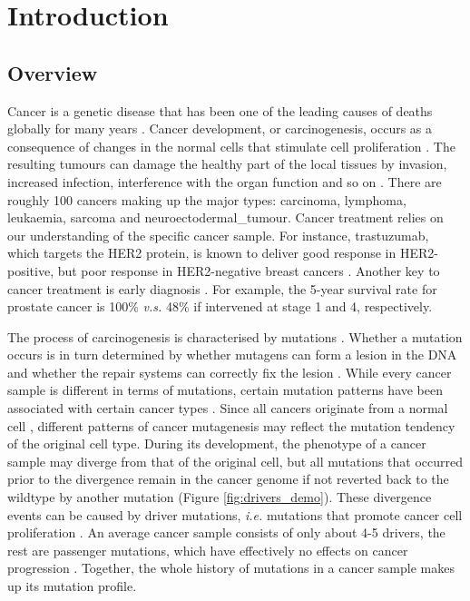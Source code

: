 \chapter{Introduction}\label{intro}

\section{Overview}

Cancer is a genetic disease that has been one of the leading causes of deaths globally for many years \citep{Bray2021TheWorldwide}. Cancer development, or carcinogenesis, occurs as a consequence of changes in the normal cells that stimulate cell proliferation \citep{Weinberg1996HowArises}. The resulting tumours can damage the healthy part of the local tissues by invasion, increased infection, interference with the organ function and so on \citep{Tobias2014CancerManagement}. There are roughly 100 cancers making up the major types: \gls{carcinoma}, \gls{lymphoma}, \gls{leukaemia}, \gls{sarcoma} and \gls{neuroectodermal_tumour}. Cancer treatment relies on our understanding of the specific cancer sample. For instance, trastuzumab, which targets the HER2 protein, is known to deliver good response in HER2-positive, but poor response in HER2-negative breast cancers \citep{Kreutzfeldt2020TheTherapies}. Another key to cancer treatment is early diagnosis \citep{Hawkes2019CancerDiagnosis}. For example, the 5-year survival rate for prostate cancer is 100\% \textit{v.s.} 48\% if intervened at stage 1 and 4, respectively. 

The process of \gls{carcinogenesis} is characterised by mutations \citep{Stratton2009}. Whether a mutation occurs is in turn determined by whether mutagens can form a \gls{lesion} in the DNA and whether the repair systems can correctly fix the lesion \citep{Chatterjee2017MechanismsMutagenesis}. While every cancer sample is different in terms of mutations, certain mutation patterns have been associated with certain cancer types \citep{Alexandrov2013,Polak2015,Campbell2020}. Since all cancers originate from a normal cell \citep{Hanahan2011HallmarksGeneration}, different patterns of cancer \gls{mutagenesis} may reflect the mutation tendency of the original cell type. During its development, the phenotype of a cancer sample may diverge from that of the original cell, but all mutations that occurred prior to the divergence remain in the cancer genome if not reverted back to the wildtype by another mutation (Figure \ref{fig:drivers_demo}). These divergence events can be caused by driver mutations, \textit{i.e.} mutations that promote cancer cell proliferation \citep{Pon2015}. An average cancer sample consists of only about 4-5 drivers, the rest are passenger mutations, which have effectively no effects on cancer progression \citep{Campbell2020}. Together, the whole history of mutations in a cancer sample makes up its mutation profile. 

